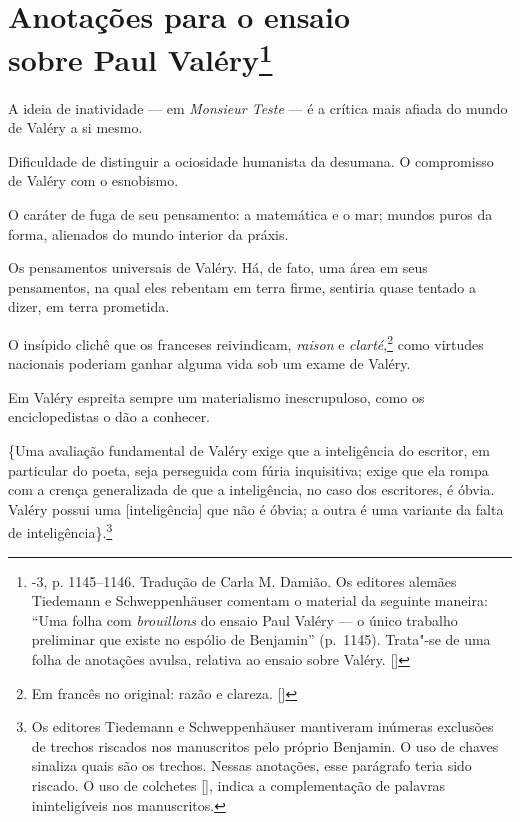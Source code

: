 
\chapter[Anotações para o ensaio sobre Paul Valéry \medskip]{Anotações para o ensaio\\ sobre Paul Valéry\footnote[*]{-3, p. 1145--1146. Tradução de Carla M. Damião. Os
  editores alemães Tiedemann e Schweppenhäuser comentam o material da
  seguinte maneira: ``Uma folha com \emph{brouillons} do ensaio Paul
  Valéry --- o único trabalho preliminar que existe no espólio de
  Benjamin'' (p.~1145). Trata"-se de uma folha de anotações avulsa, relativa ao ensaio sobre Valéry. []}}

A ideia de inatividade --- em \emph{Monsieur Teste} --- é a crítica mais afiada do
mundo de Valéry a si mesmo.

Dificuldade de distinguir a ociosidade humanista da desumana. O
compromisso de Valéry com o esnobismo.

O caráter de fuga de seu pensamento: a matemática e o mar; mundos puros
da forma, alienados do mundo interior da práxis.

Os pensamentos universais de Valéry. Há, de fato, uma área em seus
pensamentos, na qual eles rebentam em terra firme, sentiria quase tentado
a dizer, em terra prometida.

O insípido clichê que os franceses reivindicam, \emph{raison} e
\emph{clarté},\footnote{Em francês no original: razão e clareza. []} como virtudes nacionais poderiam ganhar alguma vida
sob um exame de Valéry.

Em Valéry espreita sempre um materialismo inescrupuloso, como os
enciclopedistas o dão a conhecer.

\{Uma avaliação fundamental de Valéry exige que a inteligência do escritor,
em particular do poeta, seja perseguida com fúria inquisitiva; exige que
ela rompa com a crença generalizada de que a inteligência, no caso dos
escritores, é óbvia. Valéry possui uma {[}inteligência{]} que não é %
óbvia; a outra é uma variante da falta de inteligência\}.\footnote{Os editores Tiedemann e Schweppenhäuser mantiveram inúmeras
exclusões de trechos riscados nos manuscritos pelo próprio Benjamin. O uso de chaves {} sinaliza quais são os trechos. Nessas anotações, esse parágrafo teria sido riscado. O uso de colchetes [], indica a complementação de palavras ininteligíveis nos manuscritos.}

